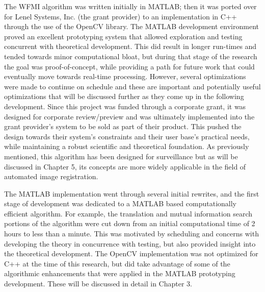 %
%
%
%
%
%
%
%
%

%
%
%



The WFMI algorithm was written initially in MATLAB\textsuperscript{\textregistered}; then it was ported over for Lenel Systems, Inc. (the grant provider) to an implementation in C++ through the use of the OpenCV library. The MATLAB\textsuperscript{\textregistered} development environment proved an excellent prototyping system that allowed exploration and testing concurrent with theoretical development. This did result in longer run-times and tended towards minor computational bloat, but during that stage of the research the goal was proof-of-concept, while providing a path for future work that could eventually move towards real-time processing. However, several optimizations were made to continue on schedule and these are important and potentially useful optimizations that will be discussed further as they come up in the following development. Since this project was funded through a corporate grant, it was designed for corporate review/preview and was ultimately implemented into the grant provider's system to be sold as part of their product. This pushed the design towards their system's constraints and their user base's practical needs, while maintaining a robust scientific and theoretical foundation. As previously mentioned, this algorithm has been designed for surveillance but as will be discussed in Chapter 5, its concepts are more widely applicable in the field of automated image registration.

The MATLAB\textsuperscript{\textregistered} implementation went through several initial rewrites, and the first stage of development was dedicated to a MATLAB\textsuperscript{\textregistered} based computationally efficient algorithm. For example, the translation and mutual information search portions of the algorithm were cut down from an initial computational time of 2 hours to less than a minute. This was motivated by scheduling and concerns with developing the theory in concurrence with testing, but also provided insight into the theoretical development. The OpenCV implementation was not optimized for C++ at the time of this research, but did take advantage of some of the algorithmic enhancements that were applied in the MATLAB\textsuperscript{\textregistered} prototyping development. These will be discussed in detail in Chapter 3.

